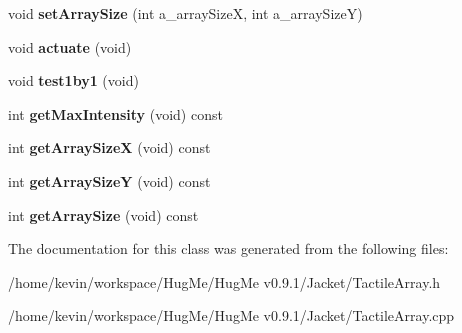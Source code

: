 \begin{DoxyCompactItemize}
\item 
\hypertarget{classTactileArray_adc94914edaa38a6c261f2b8a42f88bbb}{
void {\bfseries setArraySize} (int a\_\-arraySizeX, int a\_\-arraySizeY)}
\label{classTactileArray_adc94914edaa38a6c261f2b8a42f88bbb}

\item 
\hypertarget{classTactileArray_a2d2e28e36c7d0f166e06d5061ba85196}{
void {\bfseries actuate} (void)}
\label{classTactileArray_a2d2e28e36c7d0f166e06d5061ba85196}

\item 
\hypertarget{classTactileArray_a40a5564388ad4ee3fabf8b9866538b48}{
void {\bfseries test1by1} (void)}
\label{classTactileArray_a40a5564388ad4ee3fabf8b9866538b48}

\item 
\hypertarget{classTactileArray_a5bb334c3d9bca1949141f7ae4a6637ba}{
int {\bfseries getMaxIntensity} (void) const }
\label{classTactileArray_a5bb334c3d9bca1949141f7ae4a6637ba}

\item 
\hypertarget{classTactileArray_a7a573669d558b1a22bf3e943795af119}{
int {\bfseries getArraySizeX} (void) const }
\label{classTactileArray_a7a573669d558b1a22bf3e943795af119}

\item 
\hypertarget{classTactileArray_a7dbe69bda14b3c208d96f4e5e1fa19be}{
int {\bfseries getArraySizeY} (void) const }
\label{classTactileArray_a7dbe69bda14b3c208d96f4e5e1fa19be}

\item 
\hypertarget{classTactileArray_afffd3159074b989045c47807b133cbec}{
int {\bfseries getArraySize} (void) const }
\label{classTactileArray_afffd3159074b989045c47807b133cbec}

\end{DoxyCompactItemize}


The documentation for this class was generated from the following files:\begin{DoxyCompactItemize}
\item 
/home/kevin/workspace/HugMe/HugMe v0.9.1/Jacket/TactileArray.h\item 
/home/kevin/workspace/HugMe/HugMe v0.9.1/Jacket/TactileArray.cpp\end{DoxyCompactItemize}
